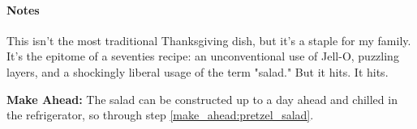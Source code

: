 \documentclass[12pt]{article}
\newenvironment*{notes}
	{
		\paragraph*{Notes}
		\begin{adjustwidth}{1cm}{}
	}
	{
		\end{adjustwidth}
	}
\begin{document}
	\begin{notes}
		This isn't the most traditional Thanksgiving dish, but it's a staple for my family. It's the epitome of a seventies recipe: an unconventional use of Jell-O, puzzling layers, and a shockingly liberal usage of the term "salad." But it hits. It hits.
		
		\textbf{Make Ahead:} The salad can be constructed up to a day ahead and chilled in the refrigerator, so through step \ref{make_ahead:pretzel_salad}.
	\end{notes}
	
\end{document}

